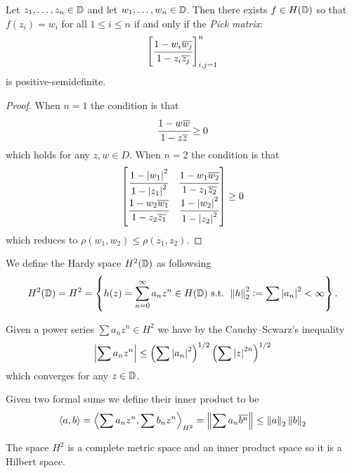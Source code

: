 \documentclass[11pt,a4paper]{article}
\begin{document}
\begin{theorem}
  \label{thm:pick}
  Let $z_1,\dots,z_n \in \mathbb{D}$ and let
  $w_1,\dots,w_n \in \mathbb{D}$.
  Then there exists $f \in H(\mathbb{D})$ so that
  $f(z_i) = w_i$ for all $1 \le i \le n$ if and only if
  the \textit{Pick matrix}:
  \[
    \begin{bmatrix}
      \cfrac{1 - w_i \overline{w_j}}{1 - z_i \overline{z_j}}
    \end{bmatrix}_{i,j=1}^{n}
  \]
  is positive-semidefinite.
\end{theorem}
\begin{proof}
  When $n = 1$ the condition is that
  \[
    \cfrac{1 - w \overline{w}}{1 - z \overline{z}} \geq 0
  \]
  which holds for any $z,w \in D$.
  When $n = 2$ the condition is that
  \[
    \begin{bmatrix}
      \cfrac{1 - \left\lvert w_1\right\rvert^2}{1 - \left\lvert z_1\right\rvert^2} &
      \cfrac{1 - w_1 \overline{w_2}}{1 - z_1 \overline{z_2}}
      \\
      \cfrac{1 - w_2 \overline{w_1}}{1 - z_2 \overline{z_1}} &
      \cfrac{1 - \left\lvert w_2\right\rvert^2}{1 - \left\lvert z_2\right\rvert^2}
    \end{bmatrix} \geq 0
  \]
  which reduces to
  $\rho(w_1,w_2) \le \rho(z_1,z_2)$.
\end{proof}

\begin{definition}
  We define the Hardy space $H^2(\mathbb{D})$ as followsing
  \[
    H^2(\mathbb{D}) = H^2 =
    \left\{h(z) = \sum_{n=0}^{\infty} a_n z^n \in H(\mathbb{D}) \text{ s.t. }
    \left\lVert h\right\rVert_2^2 := \sum \left\lvert a_n\right\rvert^2 < \infty\right\}.
  \]
\end{definition}
\begin{remark}
  Given a power series $\sum a_n z^n \in H^2$ we have by
  the Cauchy--Scwarz's inequality
  \[
    \abs{\sum a_n z^n} \le
    \del{\sum \abs{a_n}^2}^{1/2}
    \del{\sum \abs{z}^{2n}}^{1/2}
  \]
  which converges for any $z \in \mathbb{D}$.
\end{remark}

\begin{definition}
  Given two formal sums we define their inner product to be
  \[
    \left\langle a, b \right\rangle =
    \left\langle \sum a_n z^n, \sum b_n z^n \right\rangle_{H^2} =
    \left\lVert\sum a_n \overline{b^n}\right\rVert \le
    \left\lVert a\right\rVert_2 \left\lVert b\right\rVert_2
  \]
\end{definition}

\begin{remark}
  The space $H^2$ is a complete metric space and an inner
  product space so it is a Hilbert space.
\end{remark}
\end{document}
